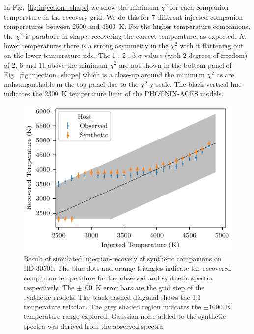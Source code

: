 \documentclass[fleqn,usenatbib]{mnras}
\begin{document}
    In Fig.~\ref{fig:injection_shape} we show the minimum \(\chi^2\) for each companion temperature in the recovery grid. We do this for 7 different injected companion temperatures between 2500 and 4500~K. For the higher temperature companions, the \(\chi^2\) is parabolic in shape, recovering the correct temperature, as expected. At lower temperatures there is a strong asymmetry in the \(\chi^2\) with it flattening out on the lower temperature side.
    The 1-, 2-, 3-\(\sigma\) values (with 2 degrees of freedom) of 2, 6 and 11 above the minimum \(\chi^2\) are not shown in the bottom panel of Fig.~\ref{fig:injection_shape} which is a close-up around the minimum \(\chi^2\) as are indistinguishable in the top panel due to the \(\chi^2\) y-scale. The black vertical line indicates the 2300~K temperature limit of the PHOENIX-ACES models.
    
    
    \begin{figure}
        \centering
        \includegraphics[width=0.95\hsize]{images/fig7.pdf}
        \caption{Result of simulated injection-recovery of synthetic companions on {HD 30501}. The blue dots and orange triangles indicate the recovered companion temperature for the observed and synthetic spectra respectively. The \(\pm100\)~K error bars are the grid step of the synthetic models. The black dashed diagonal shows the 1:1 temperature relation. The grey shaded region indicates the \(\pm1000\)~K temperature range explored. Gaussian noise added to the synthetic spectra was derived from the observed spectra.}
        \label{fig:injection-recovery}
    \end{figure}
    
\end{document}
